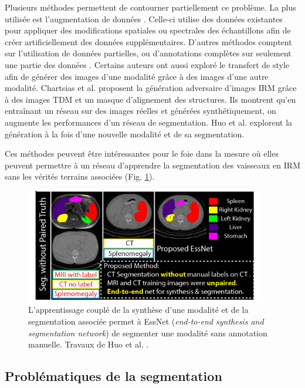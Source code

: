       Plusieurs méthodes permettent de contourner partiellement ce problème. La plus utilisée est l'augmentation de données \cite{Liskowski2016_data_augmentation}. Celle-ci utilise des données existantes pour appliquer des modifications spatiales ou spectrales des échantillons afin de créer artificiellement des données supplémentaires. D'autres méthodes comptent sur l'utilisation de données partielles, ou d'annotations complètes sur seulement une partie des données \cite{Tajbakhsh2020_imperfect_datasets}. Certains auteurs ont aussi exploré le transfert de style afin de générer des images d'une modalité grâce à des images d'une autre modalité. Chartsias et al. \cite{Chartsias2017_heart_adversarial_im} proposent la génération adversaire d'images IRM grâce à des images TDM et un masque d'alignement des structures. Ils montrent qu'en entraînant un réseau sur des images réelles et générées synthétiquement, on augmente les performances d'un réseau de segmentation. Huo et al. \cite{Huo2018_adversarial} explorent la génération à la fois d'une nouvelle modalité et de sa segmentation.

      Ces méthodes peuvent être intéressantes pour le foie dans la mesure où elles peuvent permettre à un réseau d'apprendre la segmentation des vaisseaux en IRM sans les vérités terrains associées (Fig. \ref{fig:ESSNet}).

      \begin{figure}[!ht]
        \centering
        \includegraphics[height=5cm]{Images/ESSNET_application.png}
        \caption{L'apprentissage couplé de la synthèse d'une modalité et de la segmentation associée permet à EssNet (\textit{end-to-end synthesis and segmentation network}) de segmenter une modalité sans annotation manuelle. Travaux de Huo et al. \cite{Huo2018_adversarial}. }
        \label{fig:ESSNet}
      \end{figure}

    \subsection{Problématiques de la segmentation}
    \label{sec:problems_segmenation}

